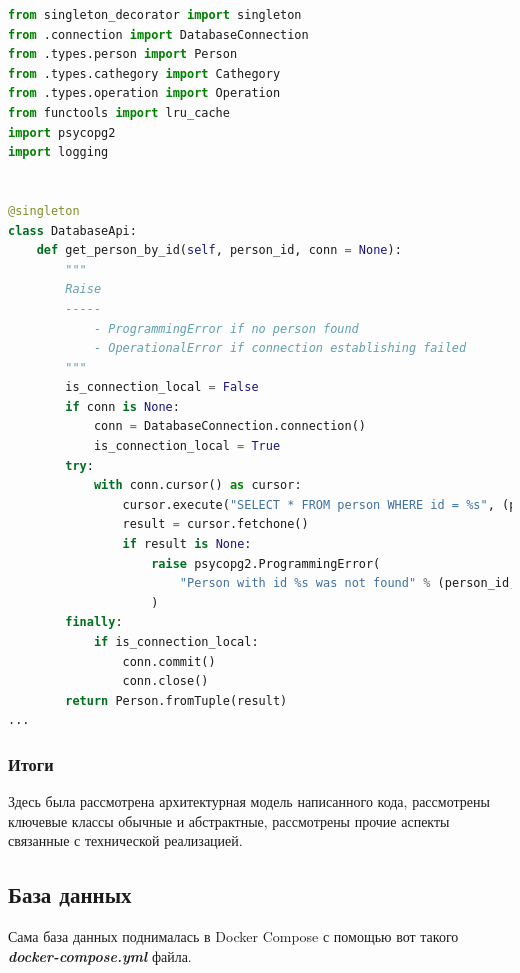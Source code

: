 \documentclass[12pt]{extarticle}
\begin{document}
\begin{lstlisting}[language=Python,style=mystyle,caption=class ReturningResultHandler]
from singleton_decorator import singleton
from .connection import DatabaseConnection
from .types.person import Person
from .types.cathegory import Cathegory
from .types.operation import Operation
from functools import lru_cache
import psycopg2
import logging


@singleton
class DatabaseApi:
    def get_person_by_id(self, person_id, conn = None):
        """
        Raise
        -----
            - ProgrammingError if no person found
            - OperationalError if connection establishing failed
        """
        is_connection_local = False
        if conn is None:
            conn = DatabaseConnection.connection()
            is_connection_local = True
        try:
            with conn.cursor() as cursor:
                cursor.execute("SELECT * FROM person WHERE id = %s", (person_id,))
                result = cursor.fetchone()
                if result is None:
                    raise psycopg2.ProgrammingError(
                        "Person with id %s was not found" % (person_id,)
                    )
        finally:
            if is_connection_local:
                conn.commit()
                conn.close()
        return Person.fromTuple(result)
...
\end{lstlisting}

\subsubsection{Итоги}

Здесь была рассмотрена архитектурная модель написанного кода, рассмотрены ключевые классы обычные и абстрактные, рассмотрены прочие аспекты связанные с технической реализацией.

\subsection{База данных}

Сама база данных поднималась в Docker Compose с помощью вот такого \textit{\textbf{docker-compose.yml}} файла.
\end{document}
